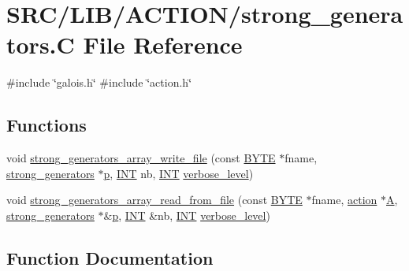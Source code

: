 \hypertarget{strong__generators_8_c}{}\section{S\+R\+C/\+L\+I\+B/\+A\+C\+T\+I\+O\+N/strong\+\_\+generators.C File Reference}
\label{strong__generators_8_c}
{\ttfamily \#include \char`\"{}galois.\+h\char`\"{}}\newline
{\ttfamily \#include \char`\"{}action.\+h\char`\"{}}\newline
\subsection*{Functions}
\begin{DoxyCompactItemize}
\item 
void \mbox{\hyperlink{strong__generators_8_c_a05972d528ab7056885299e2d37354dd0}{strong\+\_\+generators\+\_\+array\+\_\+write\+\_\+file}} (const \mbox{\hyperlink{galois_8h_ab6cc7b4aeb6ea31aba2b3fbfc83ff5e6}{B\+Y\+TE}} $\ast$fname, \mbox{\hyperlink{classstrong__generators}{strong\+\_\+generators}} $\ast$\mbox{\hyperlink{alphabet2_8_c_a533391314665d6bf1b5575e9a9cd8552}{p}}, \mbox{\hyperlink{galois_8h_a09fddde158a3a20bd2dcadb609de11dc}{I\+NT}} nb, \mbox{\hyperlink{galois_8h_a09fddde158a3a20bd2dcadb609de11dc}{I\+NT}} \mbox{\hyperlink{simeon_8_c_a818073fbcc2f439e7c56952f67386122}{verbose\+\_\+level}})
\item 
void \mbox{\hyperlink{strong__generators_8_c_a10b970b6d450a63a62107002484aaf2e}{strong\+\_\+generators\+\_\+array\+\_\+read\+\_\+from\+\_\+file}} (const \mbox{\hyperlink{galois_8h_ab6cc7b4aeb6ea31aba2b3fbfc83ff5e6}{B\+Y\+TE}} $\ast$fname, \mbox{\hyperlink{classaction}{action}} $\ast$\mbox{\hyperlink{simeon_8_c_a97833f04c3a9c008df5521a2fc291bb4}{A}}, \mbox{\hyperlink{classstrong__generators}{strong\+\_\+generators}} $\ast$\&\mbox{\hyperlink{alphabet2_8_c_a533391314665d6bf1b5575e9a9cd8552}{p}}, \mbox{\hyperlink{galois_8h_a09fddde158a3a20bd2dcadb609de11dc}{I\+NT}} \&nb, \mbox{\hyperlink{galois_8h_a09fddde158a3a20bd2dcadb609de11dc}{I\+NT}} \mbox{\hyperlink{simeon_8_c_a818073fbcc2f439e7c56952f67386122}{verbose\+\_\+level}})
\end{DoxyCompactItemize}


\subsection{Function Documentation}
\mbox{\label{strong__generators_8_c_a10b970b6d450a63a62107002484aaf2e}} 
